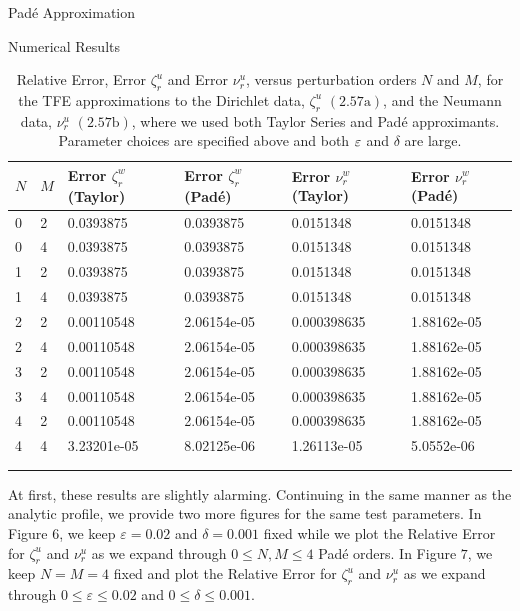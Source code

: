 \begin{section}{Pad\'e Approximation}
\begin{section}{Numerical Results}
\vspace{3mm}
\label{Second Numerical Tests Upper Layer}
\setcounter{table}{1}
\begin{longtable}[c]{llllll} \toprule
    {$N$} & {$M$} & {Error ${\zeta^w_r}$ (Taylor)} & {Error $\zeta^w_r$ (Padé)} & {Error $\nu^w_r$ (Taylor)} & {Error $\nu^w_r$ (Padé)}  \\ \midrule
0 & 2 & 0.0393875   & 0.0393875   & 0.0151348   & 0.0151348   \\
0 & 4 & 0.0393875   & 0.0393875   & 0.0151348   & 0.0151348   \\
1 & 2 & 0.0393875   & 0.0393875   & 0.0151348   & 0.0151348   \\
1 & 4 & 0.0393875   & 0.0393875   & 0.0151348   & 0.0151348   \\
2 & 2 & 0.00110548  & 2.06154e-05 & 0.000398635 & 1.88162e-05 \\
2 & 4 & 0.00110548  & 2.06154e-05 & 0.000398635 & 1.88162e-05 \\
3 & 2 & 0.00110548  & 2.06154e-05 & 0.000398635 & 1.88162e-05 \\
3 & 4 & 0.00110548  & 2.06154e-05 & 0.000398635 & 1.88162e-05 \\
4 & 2 & 0.00110548  & 2.06154e-05 & 0.000398635 & 1.88162e-05 \\
4 & 4 & 3.23201e-05 & 8.02125e-06 & 1.26113e-05 & 5.0552e-06 \\ \bottomrule
\\
\caption{Relative Error, Error ${\zeta^u_r}$ and Error $\nu^u_r$, versus perturbation orders $N$ and $M$, for the TFE approximations to the Dirichlet data, $\zeta^u_r$ $(2.57\text{a})$, and the Neumann data, $\nu^u_r$ $(2.57\text{b})$, where we used both Taylor Series and Padé approximants. Parameter choices are specified above and both  $\varepsilon$ and $\delta$ are large.}
\end{longtable}
\vspace{-1mm}
At first, these results are slightly alarming. Continuing in the same manner as the analytic profile, we provide two more figures for the same test parameters. In Figure $6$, we keep $\varepsilon = 0.02$ and $\delta = 0.001$ fixed while we plot the Relative Error for $\zeta^u_r$ and $\nu^u_r$ as we expand through $0\leq N,M \leq 4$ Padé orders. In Figure $7$, we keep $N=M=4$ fixed and plot the Relative Error for $\zeta^u_r$ and $\nu^u_r$ as we expand through $0\leq \varepsilon \leq 0.02$ and $0 \leq \delta \leq 0.001$.


\end{section}
\end{section}
